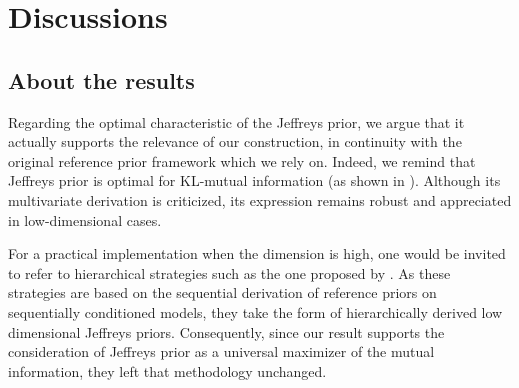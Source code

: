 \section{Discussions}\label{sec:PSGSA:discussion}


    \subsection{About the results}




Regarding the optimal characteristic of the Jeffreys prior, we argue that it actually supports  the relevance of our construction, in continuity with the original reference prior framework which we rely on. Indeed, we remind that Jeffreys prior is optimal for KL-mutual information (as shown in \cite{clarke_jeffreys_1994}). Although its multivariate derivation is criticized, its expression remains robust and appreciated in low-dimensional cases.


For a practical implementation when the dimension is high, one would be invited to refer to hierarchical strategies such as the one proposed by \citet{berger_overall_2015}. 
As these strategies are based on the sequential derivation of reference priors on sequentially conditioned models, they take the form of hierarchically derived low dimensional Jeffreys priors. Consequently, 
since our result supports the consideration of Jeffreys prior as a universal maximizer of the mutual information, they left that methodology unchanged.


